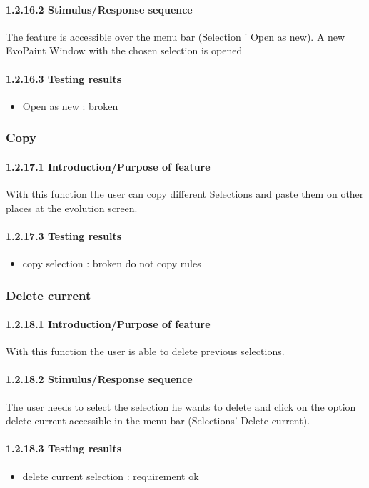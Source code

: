 \documentclass[titlepage,12pt]{scrartcl}
\begin{document}
\paragraph{1.2.16.2 Stimulus/Response sequence}
The feature is accessible over the menu bar (Selection ' Open as new). A new EvoPaint Window with the chosen selection is opened
\paragraph{1.2.16.3 Testing results}
\begin{itemize}
	\item Open as new : broken
\end{itemize}

\subsubsection{Copy}
\paragraph{1.2.17.1 Introduction/Purpose of feature}
With this function the user can copy different Selections and paste them on other places at the evolution screen.
\paragraph{1.2.17.3 Testing results}
\begin{itemize}
	\item copy selection 	: broken do not copy rules
\end{itemize}

\subsubsection{Delete current}
\paragraph{1.2.18.1 Introduction/Purpose of feature}
With this function the user is able to delete previous selections.
\paragraph{1.2.18.2 Stimulus/Response sequence}
The user needs to select the selection he wants to delete and click on the option delete current accessible in the menu bar (Selections' Delete current).
\paragraph{1.2.18.3 Testing results}
\begin{itemize}
	\item delete current selection : requirement ok
\end{itemize}
\end{document}
